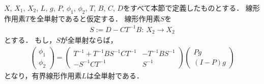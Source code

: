 \begin{Thm} \label{thm:infinite_Gauss}
	$X$, $X_1$, $X_2$, $L$, $g$, $P$, $\phi_1$, $\phi_2$, $T$, $B$, $C$, $D$をすべて本節で定義したものとする．
	線形作用素$T$を全単射であると仮定する．
	線形作用素$S$を
	\begin{align} \label{def:S_operator}
		S := D - C T^{-1} B : ~ X_2 \rightarrow X_2
	\end{align}
	とする．
	もし，$S$が全単射ならば，
	\begin{align*}
	\left( \begin{array}{c}
		\phi_1 \\
		\phi_2
	\end{array} \right) = \left( \begin{array}{cc}
		T^{-1} + T^{-1} B S^{-1} C T^{-1} & -T^{-1} B S^{-1} \\
		-S^{-1} C T^{-1} & S^{-1}
	\end{array} \right) \left( \begin{array}{c}
		Pg \\
		(I-P)g
	\end{array} \right)
	\end{align*}
	となり，有界線形作用素$L$は全単射である．
\end{Thm}

